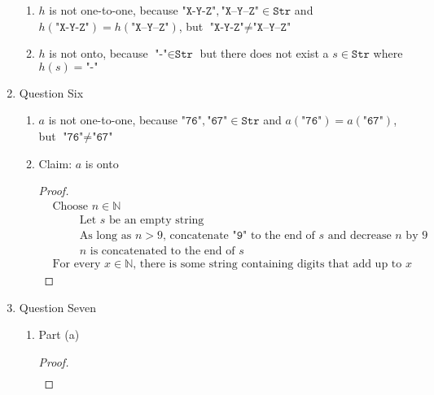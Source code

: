 \documentclass{article}
\begin{document}
\begin{enumerate}
\begin{enumerate}
        \item $h$ is not one-to-one, because $\texttt{"X-Y-Z"}, \texttt{"X--Y--Z"} \in \texttt{Str}$ and $h(\texttt{"X-Y-Z"}) = h(\texttt{"X--Y--Z"})$, but $\texttt{"X-Y-Z"} \neq \texttt{"X--Y--Z"}$
        \item $h$ is not onto, because $\texttt{"-"} \in \texttt{Str}$ but there does not exist a $s \in \texttt{Str}$ where $h(s) = \texttt{"-"}$
    \end{enumerate}
    \item Question Six
    \begin{enumerate}
        \item $a$ is not one-to-one, because $\texttt{"76"},\texttt{"67"} \in \texttt{Str}$ and $a(\texttt{"76"}) = a(\texttt{"67"})$, but $\texttt{"76"} \neq \texttt{"67"}$
        \item Claim: $a$ is onto
        \begin{proof}
            \begin{align}
                &\text{Choose } n \in \mathbb{N} \\
                &\hspace{1cm} \text{Let } s \text{ be an empty string} \\
                &\hspace{1cm} \text{As long as $n > 9$, concatenate $\texttt{"9"}$ to the end of $s$ and decrease $n$ by 9}  \\
                &\hspace{1cm} n \text{ is concatenated to the end of } s \\
                &\text{For every } x \in \mathbb{N} \text{, there is some string containing digits that add up to } x
            \end{align}
        \end{proof}
    \end{enumerate}
    \item Question Seven
    \begin{enumerate}
        \item Part (a)
        \begin{proof}
            \begin{align}
                &
            \end{align}
        \end{proof}
    \end{enumerate}
\end{enumerate}
\end{document}

